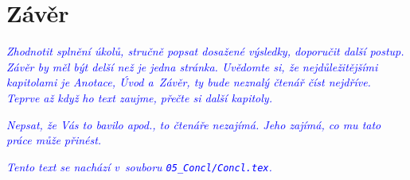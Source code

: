 ﻿\chapter{Závěr \label{ch:Zaver}}





\textcolor{blue}{\em Zhodnotit splnění úkolů, stručně popsat dosažené výsledky, doporučit další postup. Závěr by měl být delší než je jedna stránka. Uvědomte si, že nejdůležitějšími kapitolami je Anotace, Úvod a~Závěr, ty bude neznalý čtenář číst nejdříve. Teprve až když ho text zaujme, přečte si další  kapitoly.\/}

\textcolor{blue}{\em Nepsat, že Vás to bavilo apod., to čtenáře nezajímá. Jeho zajímá, co mu tato práce může přinést.\/}

\textcolor{blue}{\em Tento text se nachází v~souboru \texttt{05\_Concl/Concl.tex}.\/}
